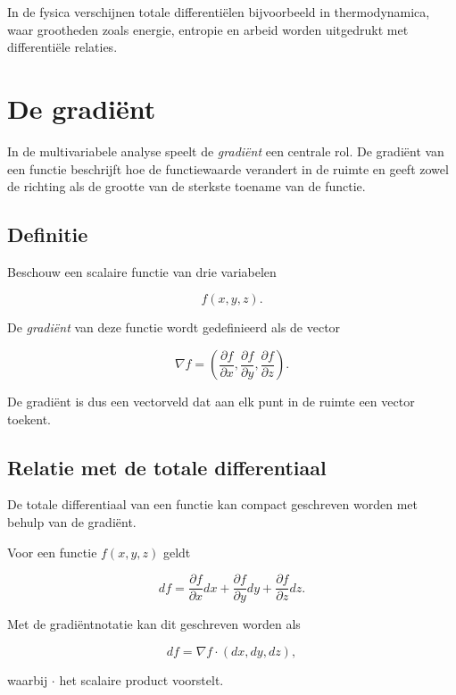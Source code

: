 \documentclass[11pt,a4paper]{article}
\begin{document}
    In de fysica verschijnen totale differentiëlen bijvoorbeeld in
    thermodynamica, waar grootheden zoals energie, entropie en arbeid
    worden uitgedrukt met differentiële relaties.


    \section{De gradiënt}

    In de multivariabele analyse speelt de \textit{gradiënt} een centrale rol.
    De gradiënt van een functie beschrijft hoe de functiewaarde verandert in de
    ruimte en geeft zowel de richting als de grootte van de sterkste toename van
    de functie.

    \subsection{Definitie}

    Beschouw een scalaire functie van drie variabelen

    \[
        f(x,y,z).
    \]

    De \textit{gradiënt} van deze functie wordt gedefinieerd als de vector

    \[
        \nabla f =
        \left(
            \frac{\partial f}{\partial x},
            \frac{\partial f}{\partial y},
            \frac{\partial f}{\partial z}
        \right).
    \]

    De gradiënt is dus een vectorveld dat aan elk punt in de ruimte een vector
    toekent.

    \subsection{Relatie met de totale differentiaal}

    De totale differentiaal van een functie kan compact geschreven worden met
    behulp van de gradiënt.

    Voor een functie $f(x,y,z)$ geldt

    \[
        df =
        \frac{\partial f}{\partial x}dx
        +
        \frac{\partial f}{\partial y}dy
        +
        \frac{\partial f}{\partial z}dz.
    \]

    Met de gradiëntnotatie kan dit geschreven worden als

    \[
        df = \nabla f \cdot (dx,dy,dz),
    \]

    waarbij $\cdot$ het scalaire product voorstelt.
\end{document}
